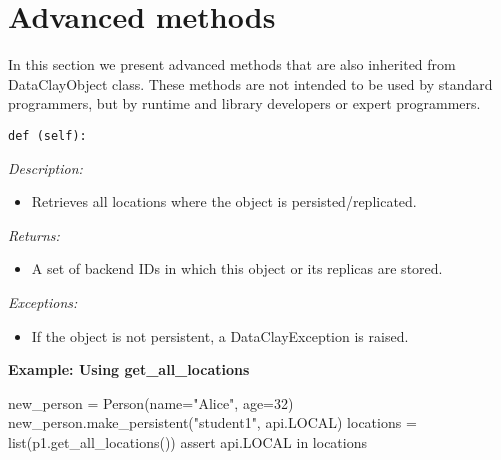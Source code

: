 \section{Advanced methods}
\label{sec:PythonObjectAdvanced}

In this section we present advanced methods that are also inherited from DataClayObject class. These methods are not intended to be used by standard programmers, but by runtime and library developers or expert programmers.



\begin{dBox}
\texttt{def (self):}
\LINE

{\it Description:}

\begin{itemize}
    \item Retrieves all locations where the object is persisted/replicated.
\end{itemize}

{\it Returns:}

\begin{itemize}
    \item A set of backend IDs in which this object or its replicas are stored.
\end{itemize}

{\it Exceptions:}

\begin{itemize}
    \item If the object is not persistent, a DataClayException is raised.
\end{itemize}

\end{dBox}

\begin{tBox}
\textcolor{basecolor} {\bf Example: Using get\_all\_locations}
\begin{python}
new_person = Person(name="Alice", age=32)
new_person.make_persistent("student1", api.LOCAL)
locations = list(p1.get_all_locations())
assert api.LOCAL in locations
\end{python}
\end{tBox}



